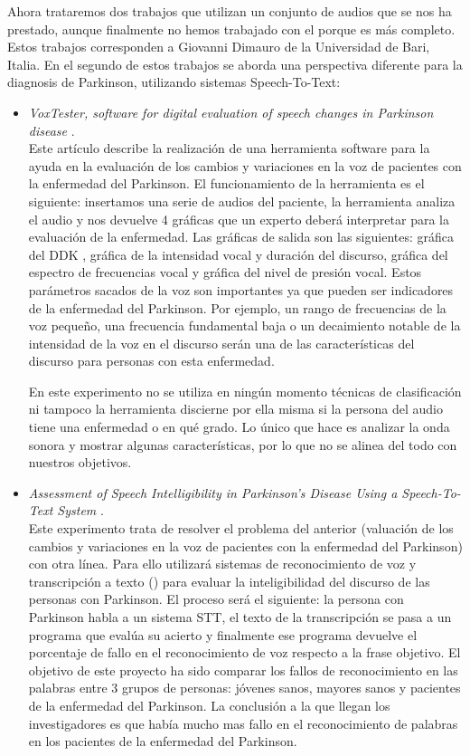 Ahora trataremos dos trabajos que utilizan un conjunto de audios que se nos ha prestado, aunque finalmente no hemos trabajado con el porque  \cite{OrzCorpus} es más completo. Estos trabajos corresponden a Giovanni Dimauro de la Universidad de Bari, Italia. En el segundo de estos trabajos se aborda una perspectiva diferente para la diagnosis de Parkinson, utilizando sistemas Speech-To-Text:
\begin{itemize}
	\item \textit{VoxTester, software for digital evaluation of speech changes in Parkinson disease} \cite{giovanni1}.\\
	Este artículo describe la realización de una herramienta software para la ayuda en la evaluación de los cambios y variaciones en la voz de pacientes con la enfermedad del Parkinson. El funcionamiento de la herramienta es el siguiente: insertamos una serie de audios del paciente, la herramienta analiza el audio y nos devuelve 4 gráficas que un experto deberá interpretar para la evaluación de la enfermedad. Las gráficas de salida son las siguientes: gráfica del DDK , gráfica de la intensidad vocal y duración del discurso, gráfica del espectro de frecuencias vocal y gráfica del nivel de presión vocal. Estos parámetros sacados de la voz son importantes ya que pueden ser indicadores de la enfermedad del Parkinson. Por ejemplo, un rango de frecuencias de la voz pequeño, una frecuencia fundamental baja o un decaimiento notable de la intensidad de la voz en el discurso serán una de las características del discurso para personas con esta enfermedad.
	
	En este experimento no se utiliza en ningún momento técnicas de clasificación ni tampoco la herramienta discierne por ella misma si la persona del audio tiene una enfermedad o en qué grado. Lo único que hace es analizar la onda sonora y mostrar algunas características, por lo que no se alinea del todo con nuestros objetivos.
	\item \textit{Assessment of Speech Intelligibility in Parkinson’s Disease Using a Speech-To-Text System} \cite{giovanni2}.\\
	Este experimento trata de resolver el problema del anterior (valuación de los cambios y variaciones en la voz de pacientes con la enfermedad del Parkinson) con otra línea. Para ello utilizará sistemas de reconocimiento de voz y transcripción a texto () para evaluar la inteligibilidad del discurso de las personas con Parkinson. El proceso será el siguiente: la persona con Parkinson habla a un sistema STT, el texto de la transcripción se pasa a un programa que evalúa su acierto y finalmente ese programa devuelve el porcentaje de fallo en el reconocimiento de voz respecto a la frase objetivo. El objetivo de este proyecto ha sido comparar los fallos de reconocimiento en las palabras entre 3 grupos de personas: jóvenes sanos, mayores sanos y pacientes de la enfermedad del Parkinson. La conclusión a la que llegan los investigadores es que había mucho mas fallo en el reconocimiento de palabras en los pacientes de la enfermedad del Parkinson.
	
\end{itemize}

